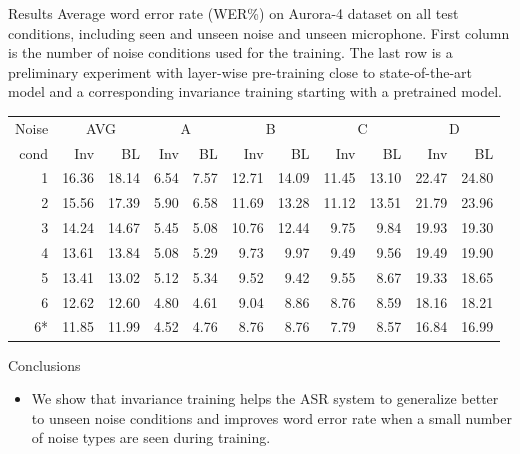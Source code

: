\documentclass[final]{beamer}
\newlength{\onecolwid}
\begin{document}
\begin{frame}[t]
\begin{columns}[t]
\begin{column}{\onecolwid}
\begin{block}{Results}
    Average word error rate (WER\%) on Aurora-4 dataset on all test conditions,
        including seen and unseen noise and unseen microphone. First column
        is the number of noise conditions used for the training. The last row is a 
        preliminary experiment with layer-wise pre-training close to state-of-the-art
        model and a corresponding invariance training starting with a pretrained model.
\begin{table}
    \centering
    \label{tab:results}
    \begin{tabular}{r|rr||rr|rr|rr|rr}
        Noise       &\multicolumn{2}{c||}{AVG}&  \multicolumn{2}{c|}{A} & \multicolumn{2}{c|}{B} & \multicolumn{2}{c|}{C} & \multicolumn{2}{c}{D}\\
        cond  & Inv & BL &  Inv & BL & Inv & BL & Inv & BL & Inv & BL\\
    \hline
    1           &\textcolor{dblue}{16.36}        &18.14 & 6.54  & 7.57    &12.71& 14.09   & 11.45&   13.10    & 22.47 &   24.80    \\
        2           &\textcolor{dblue}{15.56}        &17.39 & 5.90  & 6.58    &   11.69   &13.28   &11.12   &13.51   &21.79   &23.96 \\
        3           &\textcolor{dblue}{14.24}        &14.67 & 5.45  & 5.08    &   10.76&   12.44&   9.75&    9.84 &   19.93&   19.30\\
        4           &\textcolor{dblue}{13.61}        &13.84 & 5.08  & 5.29    &9.73    &9.97    &9.49    &9.56    &19.49   &19.90\\         
        5           &13.41        &\textcolor{dblue}{13.02} & 5.12  & 5.34    &9.52    &9.42    &9.55    &8.67    &19.33   &18.65\\         
        6           &12.62        &\textcolor{dblue}{12.60} & 4.80  & 4.61    &9.04    &8.86    &8.76    &8.59    &18.16   &18.21\\
    \hline\hline
    6*          &\textcolor{dblue}{11.85}        &11.99 &4.52    &4.76    &8.76    &8.76    &7.79    &8.57    &16.84&    16.99
    \end{tabular}
\end{table}
\end{block}

\begin{block}{Conclusions}
    \begin{itemize}
        \item We show that invariance training helps the ASR system to generalize better to unseen noise 
            conditions and improves word error rate when a small number of noise types are seen during 
            training. 


\end{itemize}
\end{block}
\end{column}
\end{columns}
\end{frame}
\end{document}
